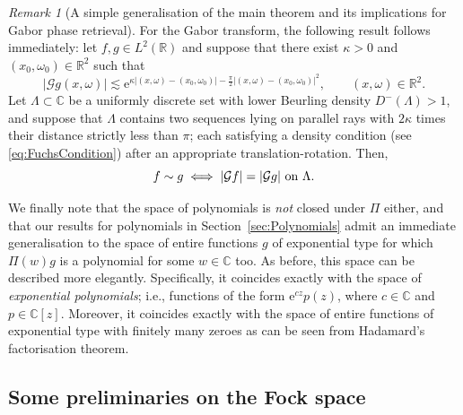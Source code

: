 \documentclass{article}
\newcommand{\bbC}{\mathbb{C}}
\newcommand{\calG}{\mathcal{G}}
\DeclarePairedDelimiter{\abs}{\lvert}{\rvert}
\theoremstyle{remark}
\newtheorem{remark}{Remark}
\begin{document}
\begin{remark}[A simple generalisation of the main theorem and its implications for Gabor phase retrieval]
        For the Gabor transform, the following result follows immediately: let $f,g \in L^2(\mathbb R)$ and suppose that there exist $\kappa > 0$ and $(x_0,\omega_0) \in \mathbb R^2$ such that
        \begin{equation*}
            \lvert \mathcal G g (x,\omega) \rvert \lesssim \mathrm e^{\kappa \lvert (x,\omega) - (x_0, \omega_0) \rvert - \frac{\pi}{2}\lvert (x,\omega) - (x_0,\omega_0)\rvert^2}, \qquad (x,\omega) \in \mathbb R^2.
        \end{equation*}
        Let $\Lambda \subset \bbC$ be a uniformly discrete set with lower Beurling density $D^{-}(\Lambda) > 1$, and suppose that $\Lambda$ contains two sequences lying on parallel rays with $2 \kappa$ times their distance strictly less than $\pi$; each satisfying a density condition (see \eqref{eq:FuchsCondition}) after an appropriate translation-rotation. Then,
        \begin{equation*}
            f \sim g \iff \abs{\calG f} = \abs{\calG g} \text{ on } \Lambda.
        \end{equation*}

        We finally note that the space of polynomials is \emph{not} closed under $\Pi$ either, and that our results for polynomials in Section~\ref{sec:Polynomials} admit an immediate generalisation to the space of entire functions $g$ of exponential type for which $\Pi(w)g$ is a polynomial for some $w \in \mathbb C$ too. As before, this space can be described more elegantly. Specifically, it coincides exactly with the space of \emph{exponential polynomials}; i.e., functions of the form $\mathrm e^{c z} p(z)$, where $c \in \mathbb C$ and $p \in \mathbb C[z]$. Moreover, it coincides exactly with the space of entire functions of exponential type with finitely many zeroes as can be seen from Hadamard's factorisation theorem. 
    \end{remark}

    \subsection{Some preliminaries on the Fock space}\label{sec:FockSpace}
\end{document}
